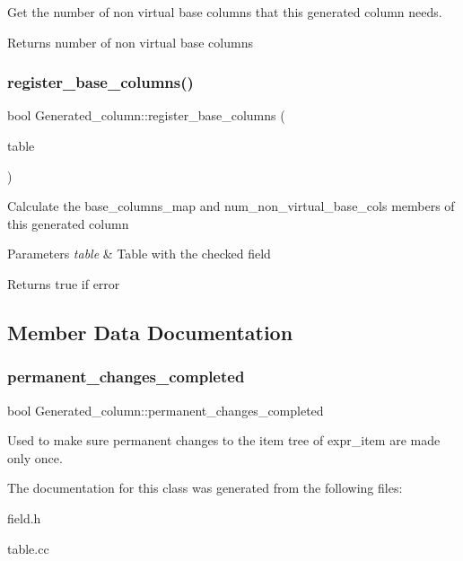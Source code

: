 Get the number of non virtual base columns that this generated column needs.

\begin{DoxyReturn}{Returns}
number of non virtual base columns 
\end{DoxyReturn}
\mbox{\label{classGenerated__column_a7bedfc60a5b287c7e77c2c2940cf3326}} 
\subsubsection{\texorpdfstring{register\+\_\+base\+\_\+columns()}{register\_base\_columns()}}
{\footnotesize\ttfamily bool Generated\+\_\+column\+::register\+\_\+base\+\_\+columns (\begin{DoxyParamCaption}\item[{\mbox{\hyperlink{structTABLE}{T\+A\+B\+LE}} $\ast$}]{table }\end{DoxyParamCaption})}

Calculate the base\+\_\+columns\+\_\+map and num\+\_\+non\+\_\+virtual\+\_\+base\+\_\+cols members of this generated column


\begin{DoxyParams}{Parameters}
{\em table} & Table with the checked field\\
\hline
\end{DoxyParams}
\begin{DoxyReturn}{Returns}
true if error 
\end{DoxyReturn}


\subsection{Member Data Documentation}
\mbox{\label{classGenerated__column_a6005a897023a9d9669d8a3a43534943e}} 
\subsubsection{\texorpdfstring{permanent\+\_\+changes\+\_\+completed}{permanent\_changes\_completed}}
{\footnotesize\ttfamily bool Generated\+\_\+column\+::permanent\+\_\+changes\+\_\+completed}

Used to make sure permanent changes to the item tree of expr\+\_\+item are made only once. 

The documentation for this class was generated from the following files\+:\begin{DoxyCompactItemize}
\item 
field.\+h\item 
table.\+cc\end{DoxyCompactItemize}
